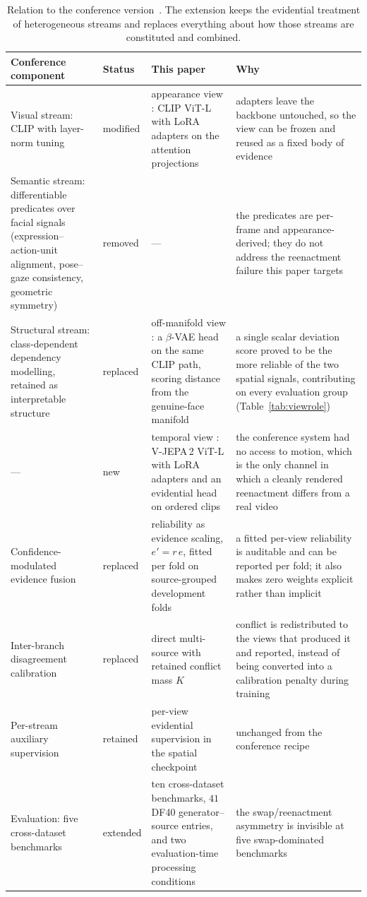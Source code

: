 \begin{table}[t]
\centering
\caption{Relation to the conference version~\cite{farooq2026discern}. The extension keeps the evidential treatment of
heterogeneous streams and replaces everything about how those streams are constituted and combined.}
\label{tab:extension}
\small
\begin{tabular}{p{}p{}p{}p{}}
\toprule
Conference component & Status & This paper & Why \\
\midrule
Visual stream: CLIP with layer-norm tuning & modified & appearance view \app{}: CLIP ViT-L with LoRA adapters on the attention projections & adapters leave the backbone untouched, so the view can be frozen and reused as a fixed body of evidence \\
Semantic stream: differentiable predicates over facial signals (expression--action-unit alignment, pose--gaze consistency, geometric symmetry) & removed & --- & the predicates are per-frame and appearance-derived; they do not address the reenactment failure this paper targets \\
Structural stream: class-dependent dependency modelling, retained as interpretable structure & replaced & off-manifold view \om{}: a $\beta$-VAE head on the same CLIP path, scoring distance from the genuine-face manifold & a single scalar deviation score proved to be the more reliable of the two spatial signals, contributing on every evaluation group (Table~\ref{tab:viewrole}) \\
--- & new & temporal view \tmp{}: V-JEPA\,2 ViT-L with LoRA adapters and an evidential head on ordered clips & the conference system had no access to motion, which is the only channel in which a cleanly rendered reenactment differs from a real video \\
Confidence-modulated evidence fusion & replaced & reliability as evidence scaling, $e'=r\,e$, fitted per fold on source-grouped development folds & a fitted per-view reliability is auditable and can be reported per fold; it also makes zero weights explicit rather than implicit \\
Inter-branch disagreement calibration & replaced & direct multi-source \pcrp{} with retained conflict mass $K$ & conflict is redistributed to the views that produced it and reported, instead of being converted into a calibration penalty during training \\
Per-stream auxiliary supervision & retained & per-view evidential supervision in the spatial checkpoint & unchanged from the conference recipe \\
Evaluation: five cross-dataset benchmarks & extended & ten cross-dataset benchmarks, $41$ DF40 generator--source entries, and two evaluation-time processing conditions & the swap/reenactment asymmetry is invisible at five swap-dominated benchmarks \\
\bottomrule
\end{tabular}
\end{table}
